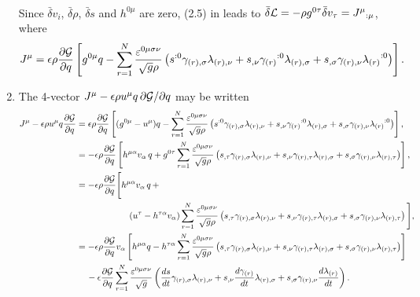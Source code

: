 \documentclass{article}
\numberwithin{equation}{section}
\begin{document}
\begin{appendices}
\begin{enumerate}[leftmargin=*]
\begin{align}
\end{align}
Since $\bar\delta v_i$, $\bar\delta \rho$, $\bar\delta s$ and $h^{0\mu}$ are zero, (2.5) in \citet{Charron18b} leads to $\bar\delta{\cal L}=-\rho g^{0\tau} \bar\delta v_\tau={J^\mu}_{:\mu}$, where
\begin{align}
J^\mu = \epsilon \rho\frac{\partial{\cal G}}{\partial q} \left[g^{0\mu}q-\sum_{r=1}^N \frac{\varepsilon^{0\mu\sigma\nu}}{\sqrt{g}\rho} \left( s^{:0}\gamma_{(r),\sigma} \lambda_{(r),\nu} + s_{,\nu} {\gamma_{(r)}}^{:0}\lambda_{(r),\sigma} + s_{,\sigma}\gamma_{(r),\nu} {\lambda_{(r)}}^{:0} \right) \right].
\end{align}
\item The 4-vector $J^\mu-\epsilon\rho u^\mu q\,\partial{\cal G}/\partial q$ may be written
\begin{align}
J^\mu - \epsilon\rho u^\mu q \frac{\partial{\cal G}}{\partial q} &= \epsilon\rho \frac{\partial{\cal G}}{\partial q} \left[ (g^{0\mu}-u^\mu)q - \sum_{r=1}^N \frac{\varepsilon^{0\mu\sigma\nu}}{\sqrt{g}\rho} \left( s^{:0}\gamma_{(r),\sigma} \lambda_{(r),\nu} + s_{,\nu} {\gamma_{(r)}}^{:0}\lambda_{(r),\sigma} + s_{,\sigma}\gamma_{(r),\nu} {\lambda_{(r)}}^{:0} \right)\right], \nonumber \\
&=-\epsilon\rho \frac{\partial{\cal G}}{\partial q} \left[ h^{\mu\alpha} v_\alpha\,q + g^{0\tau}\sum_{r=1}^N \frac{\varepsilon^{0\mu\sigma\nu}}{\sqrt{g}\rho} \left( s_{,\tau}\gamma_{(r),\sigma} \lambda_{(r),\nu} + s_{,\nu} {\gamma_{(r),\tau}}\lambda_{(r),\sigma} + s_{,\sigma}\gamma_{(r),\nu} {\lambda_{(r),\tau}} \right)\right], \nonumber \\
&=-\epsilon\rho \frac{\partial{\cal G}}{\partial q} \Bigg[ h^{\mu\alpha} v_\alpha\,q \, + \nonumber \\
&\qquad\qquad\qquad (u^\tau-h^{\tau\alpha}v_\alpha)\sum_{r=1}^N \frac{\varepsilon^{0\mu\sigma\nu}}{\sqrt{g}\rho} \left( s_{,\tau}\gamma_{(r),\sigma} \lambda_{(r),\nu} + s_{,\nu} {\gamma_{(r),\tau}}\lambda_{(r),\sigma} + s_{,\sigma}\gamma_{(r),\nu} {\lambda_{(r),\tau}} \right)\Bigg], \nonumber \\
&=-\epsilon\rho \frac{\partial{\cal G}}{\partial q} v_\alpha \left[ h^{\mu\alpha} q - h^{\tau\alpha}\sum_{r=1}^N \frac{\varepsilon^{0\mu\sigma\nu}}{\sqrt{g}\rho} \left( s_{,\tau}\gamma_{(r),\sigma} \lambda_{(r),\nu} + s_{,\nu} {\gamma_{(r),\tau}}\lambda_{(r),\sigma} + s_{,\sigma}\gamma_{(r),\nu} {\lambda_{(r),\tau}} \right)\right] \nonumber \\
&\quad\, -\epsilon\frac{\partial{\cal G}}{\partial q} \sum_{r=1}^N \frac{\varepsilon^{0\mu\sigma\nu}}{\sqrt{g}} \left( \frac{ds}{dt}\gamma_{(r),\sigma} \lambda_{(r),\nu} + s_{,\nu} \frac{d\gamma_{(r)}}{dt}\lambda_{(r),\sigma} + s_{,\sigma}\gamma_{(r),\nu} \frac{d\lambda_{(r)}}{dt} \right).

\end{align}
\end{enumerate}
\end{appendices}
\end{document}
